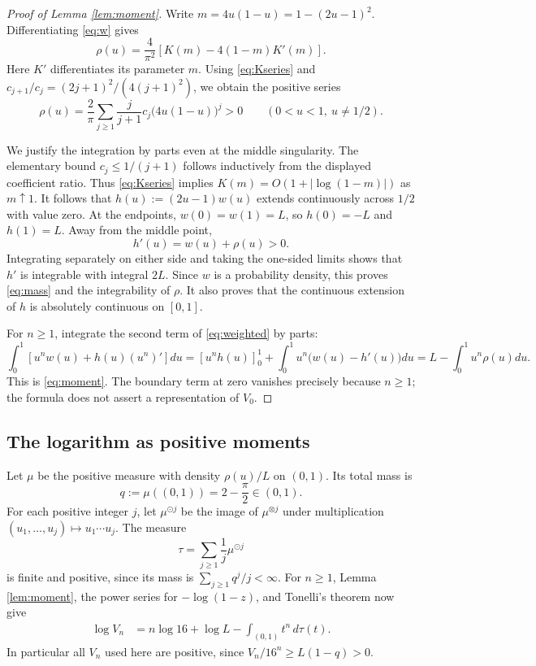 \documentclass[11pt]{article}
\begin{document}
\begin{proof}[Proof of Lemma \ref{lem:moment}]
Write $m=4u(1-u)=1-(2u-1)^2$. Differentiating \eqref{eq:w} gives
\[
 \rho(u)=\frac4{\pi^2}\left[K(m)-4(1-m)K'(m)\right].
\]
Here $K'$ differentiates its parameter $m$.
Using \eqref{eq:Kseries} and
$c_{j+1}/c_j=(2j+1)^2/(4(j+1)^2)$, we obtain the positive series
\begin{equation}\label{eq:positive}
 \rho(u)=\frac2\pi\sum_{j\geq1}\frac{j}{j+1}c_j
                         \bigl(4u(1-u)\bigr)^j>0
 \qquad(0<u<1,\ u\ne1/2).
\end{equation}

We justify the integration by parts even at the middle singularity.
The elementary bound $c_j\leq1/(j+1)$ follows inductively from the
displayed coefficient ratio. Thus \eqref{eq:Kseries} implies
$K(m)=O(1+|\log(1-m)|)$ as $m\uparrow1$.
It follows that $h(u):=(2u-1)w(u)$ extends continuously across $1/2$
with value zero. At the endpoints, $w(0)=w(1)=L$, so $h(0)=-L$ and
$h(1)=L$. Away from the middle point,
\[
 h'(u)=w(u)+\rho(u)>0.
\]
Integrating separately on either side and taking the one-sided limits
shows that $h'$ is integrable with integral $2L$. Since $w$ is a
probability density, this proves \eqref{eq:mass} and the integrability
of $\rho$. It also proves that the continuous extension of $h$ is
absolutely continuous on $[0,1]$.

For $n\geq1$, integrate the second term of \eqref{eq:weighted} by parts:
\[
 \int_0^1\left[u^nw(u)+h(u)(u^n)'\right]du
 =\left[u^nh(u)\right]_0^1
       +\int_0^1u^n\bigl(w(u)-h'(u)\bigr)du
 =L-\int_0^1u^n\rho(u)du.
\]
This is \eqref{eq:moment}. The boundary term at zero vanishes precisely
because $n\geq1$; the formula does not assert a representation of $V_0$.
\end{proof}

\subsection*{The logarithm as positive moments}
Let $\mu$ be the positive measure with density $\rho(u)/L$ on $(0,1)$.
Its total mass is
\[
 q:=\mu((0,1))=2-\frac\pi2\in(0,1).
\]
For each positive integer $j$, let $\mu^{\odot j}$ be the image of
$\mu^{\otimes j}$ under multiplication
$(u_1,\ldots,u_j)\mapsto u_1\cdots u_j$. The measure
\begin{equation}\label{eq:tau}
 \tau=\sum_{j\geq1}\frac1j\mu^{\odot j}
\end{equation}
is finite and positive, since its mass is $\sum_{j\geq1}q^j/j<\infty$.
For $n\geq1$, Lemma \ref{lem:moment}, the power series for $-\log(1-z)$,
and Tonelli's theorem now give
\begin{align}
 \log V_n
 &=n\log16+\log L-\int_{(0,1)}t^n\,d\tau(t).
 \label{eq:logmoment}
\end{align}
In particular all $V_n$ used here are positive, since
$V_n/16^n\geq L(1-q)>0$.
\end{document}
